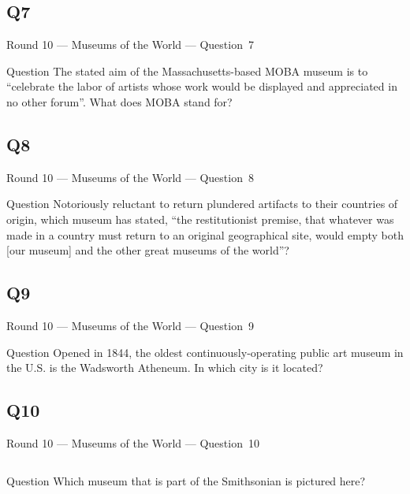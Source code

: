 \documentclass[11pt]{beamer}
\begin{document}
\subsection*{Q7}
\begin{frame}[t]{Round 10 --- Museums of the World --- \mbox{Question 7}}
\vspace{-0.5em}
\begin{block}{Question}
The stated aim of the Massachusetts-based MOBA museum is to ``celebrate the labor of artists whose work would be displayed and appreciated in no other forum''. What does MOBA stand for?
\end{block}
\end{frame}
\subsection*{Q8}
\begin{frame}[t]{Round 10 --- Museums of the World --- \mbox{Question 8}}
\vspace{-0.5em}
\begin{block}{Question}
Notoriously reluctant to return plundered artifacts to their countries of origin, which museum has stated, ``the restitutionist premise, that whatever was made in a country must return to an original geographical site, would empty both [our museum] and the other great museums of the world''?
\end{block}
\end{frame}
\subsection*{Q9}
\begin{frame}[t]{Round 10 --- Museums of the World --- \mbox{Question 9}}
\vspace{-0.5em}
\begin{block}{Question}
Opened in 1844, the oldest continuously-operating public art museum in the U.S. is the Wadsworth Atheneum. In which city is it located?
\end{block}
\end{frame}
\subsection*{Q10}
\begin{frame}[t]{Round 10 --- Museums of the World --- \mbox{Question 10}}
\vspace{-0.5em}
\begin{columns}[T,totalwidth=\linewidth]
\begin{column}{0.32\linewidth}
\begin{block}{Question}
Which museum that is part of the Smithsonian is pictured here?
\end{block}
\end{column}
\begin{column}{0.65\linewidth}
\begin{center}
\texttt{[image: \{Images/nmaahc]}.jpg}
\end{center}
\end{column}
\end{columns}
\end{frame}
\end{document}
